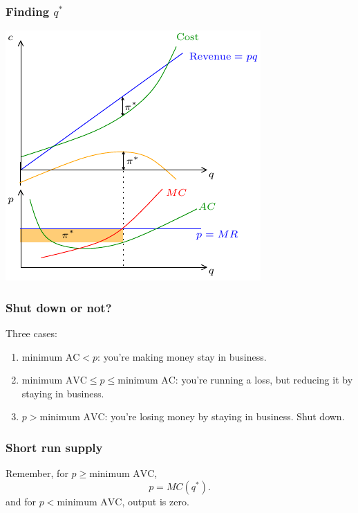 \documentclass[xcolor=pdftex,dvipsnames]{beamer}
\begin{document}
\begin{frame}
\frametitle{Finding $q^*$}
\begin{center}
\includegraphics{pics/CRProf}
\end{center}

\end{frame}





\begin{frame}\frametitle{Shut down or not?}
Three cases:
\begin{enumerate}[<+->]
\item $\text{minimum AC}< p$: you're making money stay in business.
\item $\text{minimum AVC} \leq p \leq \text{minimum AC}$: you're running a
  loss, but reducing it by staying in business.
\item $p > \text{minimum AVC}$: you're losing money by staying in
  business. Shut down.
\end{enumerate}
\end{frame} 





\begin{frame}\frametitle{Short run supply}
Remember, for $p\geq\text{minimum AVC}$,
\[
p=MC(q^*).
\] and for $p<\text{minimum AVC}$, output is zero.

\bigskip

\end{frame} 
\end{document}
